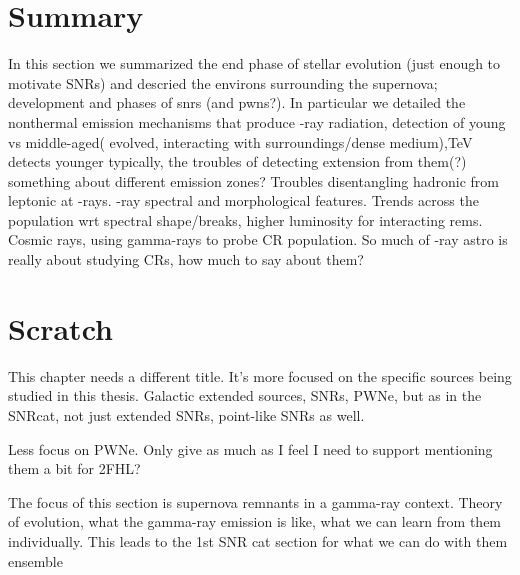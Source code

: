 \section{Summary}\label{Rems:summ} In this section we summarized the end phase of stellar evolution (just enough to motivate SNRs) and descried the environs surrounding the supernova; development and phases of \glspl{snr} (and \glspl{pwn}?).  In particular we detailed the nonthermal emission mechanisms that produce \g-ray radiation, detection of young vs middle-aged( evolved, interacting with surroundings/dense medium),TeV detects younger typically, the troubles of detecting extension from them(?) something about different emission zones? Troubles disentangling hadronic from leptonic at \g-rays. \g-ray spectral and morphological features. Trends across the population wrt spectral shape/breaks, higher luminosity for interacting rems. Cosmic rays, using gamma-rays to probe CR population. So much of \g-ray astro is really about studying CRs, how much to say about them? 

\section{Scratch}
This chapter needs a different title. It's more focused on the specific sources being studied in this thesis. Galactic extended sources, SNRs, PWNe, but as in the SNRcat, not just extended SNRs, point-like SNRs as well.

Less focus on PWNe. Only give as much as I feel I need to support mentioning them a bit for 2FHL?

The focus of this section is supernova remnants in a gamma-ray context. Theory of evolution, what the gamma-ray emission is like, what we can learn from them individually.  This leads to the 1st SNR cat section for what we can do with them ensemble
